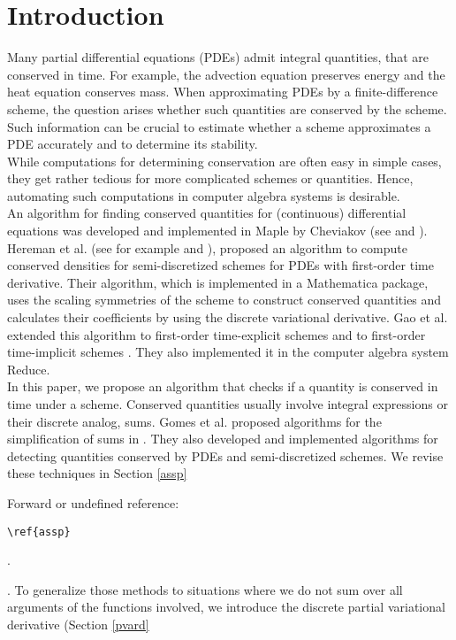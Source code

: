 \documentclass[sigconf,twocolumn]{acmart}
\newcommand{\1}{{\chi}}
\numberwithin{equation}{section}
\theoremstyle{thmlemcorr}
\numberwithin{theorem}{section}
\theoremstyle{thmlemcorr*}
\theoremstyle{defi}
\theoremstyle{remexample}
\theoremstyle{ass}
\begin{document}
\section{Introduction}
Many partial differential equations (PDEs) admit integral quantities, that are conserved in time. 
For example, the advection equation preserves energy and the heat equation conserves mass. 
When approximating PDEs by a finite-difference scheme, the question arises whether such quantities are conserved by the scheme. 
Such information can be crucial to estimate whether a scheme approximates a PDE accurately and to determine its stability.\\
While computations for determining conservation are often easy in simple cases, they get rather tedious for more complicated schemes or quantities. 
Hence, automating such computations 
in computer algebra systems is desirable.\\
An algorithm for finding conserved quantities for (continuous) differential equations was developed and implemented  in {\sc Maple} by Cheviakov (see \cite{cheviakov07} and \cite{cheviakov10}).
Hereman et al. (see for example \cite{hereman04} and \cite{hereman08}), proposed an algorithm to compute conserved densities for semi-discretized schemes for PDEs with first-order time derivative. 
Their algorithm, which is implemented in a {\sc Mathematica} package, uses the scaling symmetries of the scheme to construct conserved quantities and calculates their coefficients by using the discrete variational derivative.
Gao et al. extended this algorithm to first-order time-explicit schemes \cite{gao02} and to first-order time-implicit schemes \cite{gao04}. 
They also implemented it in the computer algebra system {\sc Reduce}.\\
In this paper, we propose an algorithm that checks if a quantity is conserved in time under a scheme.
Conserved quantities usually involve integral expressions or their discrete analog, sums.
Gomes et al. proposed algorithms for the simplification of sums in \cite{gomes20}.
They also developed and implemented algorithms for detecting quantities conserved by PDEs and semi-discretized schemes. 
We revise these techniques in Section \ref{assp}
 {\color{red} Forward or undefined reference: \begin{verbatim}\ref{assp}\end{verbatim}.}
. 
To generalize those methods to situations where we do not sum over all arguments of the functions involved, we introduce the discrete partial variational derivative (Section \ref{pvard}
\end{document}
